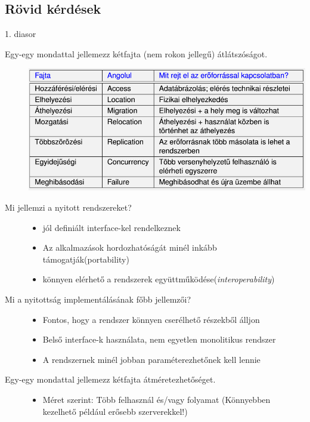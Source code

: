 \documentclass[12pt]{article}
\begin{document}
\subsection{Rövid kérdések}
1. diasor
\begin{description}
    \item[Egy-egy mondattal jellemezz kétfajta (nem rokon jellegű)
        átlátszóságot.]
        \includegraphics[scale=0.5]{images/P5.PNG}
    \item[Mi jellemzi a nyitott rendszereket?]
        \begin{itemize}
            \item jól definiált interface-kel rendelkeznek 
            \item Az alkalmazások hordozhatóságát minél inkább
                támogatják(portability)
            \item könnyen elérhető a rendszerek
                együttműködése(\textit{interoperability})
        \end{itemize}
    \item[Mi a nyitottság implementálásának főbb jellemzői?]
        \hfill
        \begin{itemize}
            \item Fontos, hogy a rendszer könnyen cserélhető részekből álljon
            \item Belső interface-k használata, nem egyetlen monolitikus
                rendszer
            \item A rendszernek minél jobban paraméterezhetőnek kell lennie
        \end{itemize}
    \item[Egy-egy mondattal jellemezz kétfajta átméretezhetőséget.]
        \hfill
        \begin{itemize}
            \item Méret szerint: Több felhasznál és/vagy folyamat  (Könnyebben
                kezelhető például erősebb szerverekkel!)

\end{itemize}
\end{description}
\end{document}
